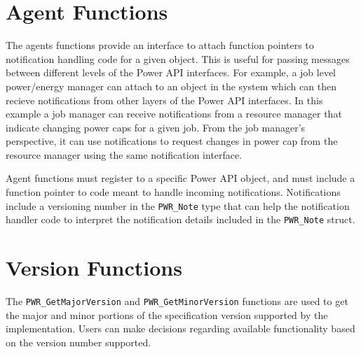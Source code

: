 \section{Agent Functions}\label{sec:AgentFunctions}
%

The agents functions provide an interface to attach function pointers to notification handling code for a given object. 
This is useful for passing messages between different levels of the Power API interfaces.
For example, a job level power/energy manager can attach to an object in the system which can then recieve notifications from other layers of the Power API interfaces. 
In this example a job manager can receive notifications from a resource manager that indicate changing power caps for a given job. 
From the job manager's perspective, it can use notifications to request changes in power cap from the resource manager using the same notification interface. 

Agent functions must register to a specific Power API object, and must include a function pointer to code meant to handle incoming notifications.
Notifications include a versioning number in the \texttt{PWR_Note} type that can help the notification handler code to interpret the notification details included in the \texttt{PWR_Note} struct. 
%





\section{Version Functions}\label{sec:VersionFunctions}

The \texttt{PWR_GetMajorVersion} and \texttt{PWR_GetMinorVersion} functions are used to get the major and minor portions of the specification version supported by the implementation. 
Users can make decisions regarding available functionality based on the version number supported.

